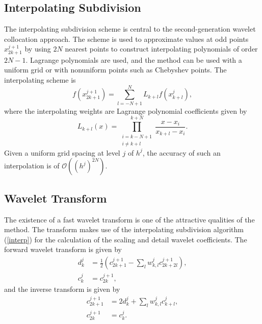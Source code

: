 \documentclass[11pt]{article}
\begin{document}
\subsection{Interpolating Subdivision}
The interpolating subdivision scheme is central to the second-generation wavelet collocation approach. The scheme is used to
approximate values at odd points $x_{2k+1}^{j+1}$ by using $2N$ nearest points to construct interpolating polynomials of 
order $2N-1$. Lagrange polynomials are used, and the method can be used with a uniform grid or with 
nonuniform points such as Chebyshev points. The interpolating scheme is 
\begin{equation}
    f(x_{2k+1}^{j+1})=\sum_{l=-N+1}^{N} L_{k+l} f(x_{k+l}^{j}), \label{interp}
\end{equation}
where the interpolating weights are Lagrange polynomial coefficients given by 
\begin{equation}
    L_{k+l}(x)=\prod_{ \substack{ i=k-N+1 \\ i\neq k+l } }^{k+N} \frac{x-x_i}{x_{k+l}-x_i}.
\end{equation}
Given a uniform grid spacing at level $j$ of $h^j$, the accuracy of such an interpolation is of $\mathcal{O}((h^{j})^{2N})$.  

\subsection{Wavelet Transform}
The existence of a fast wavelet transform is one of the attractive qualities of the method. The transform makes use of the 
interpolating subdivision algorithm (\ref{interp}) for the calculation of the scaling and detail wavelet coefficients. The forward wavelet transform is given by
\begin{equation}
	\begin{split}
		d_{k}^{j} &= \frac{1}{2} \left( c_{2k+1}^{j+1}-\sum_{l} w_{k,l}^{j} c_{2k+2l}^{j+1} \right), \\
		c_{k}^{j} &= c_{2k}^{j+1},
	\end{split}
\end{equation}
and the inverse transform is given by 
\begin{equation}
	\begin{split}
		c_{2k+1}^{j+1} &= 2 d_{k}^{j}  + \sum_{l} w_{k,l}^{j} c_{k+l}^{j}, \\
		c_{2k}^{j+1} &= c_{k}^{j}.
	\end{split}
\end{equation}
\end{document}
